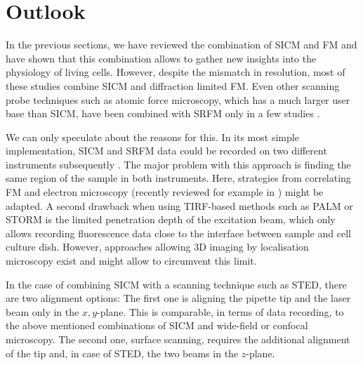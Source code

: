 \section{Outlook}
\label{sec:pitfalls}

In the previous sections, we have reviewed the combination of SICM and FM and
have shown that this combination allows to gather new insights into the
physiology of living cells. However, despite the mismatch in resolution, most
of these studies combine SICM and diffraction limited FM. Even other scanning
probe techniques such as atomic force microscopy, which has a much larger user
base than SICM, have been combined with SRFM only in a few studies
\cite{Harke2012,Chacko2013,Chacko2013b,Odermatt2015,Curry2017,Hirvonen2018}.

We can only speculate about the reasons for this. In its most simple
implementation, SICM and SRFM data could be recorded on two different
instruments subsequently \cite{Hagemann2018}. The major problem with this
approach is finding the same region of the sample in both instruments. Here,
strategies from correlating FM and electron microscopy (recently reviewed for
example in \cite{Begemann2016}) might be adapted. A second drawback when using
TIRF-based methods such as PALM or STORM is the limited penetration depth of
the excitation beam, which only allows recording fluorescence data close to
the interface between sample and cell culture dish. However, approaches
allowing 3D imaging by localisation microscopy exist
\cite{Huang2008a,Huang2008} and might allow to circumvent this limit.  



In the case of combining SICM with a scanning technique such as STED, there
are two alignment options: The first one is aligning the pipette tip and the
laser beam only in the $x,y$-plane. This is comparable, in terms of data
recording, to the above mentioned combinations of SICM and wide-field or
confocal microscopy. The second one, surface scanning, requires the
additional alignment of the tip and, in case of STED, the two beams in the
$z$-plane.


